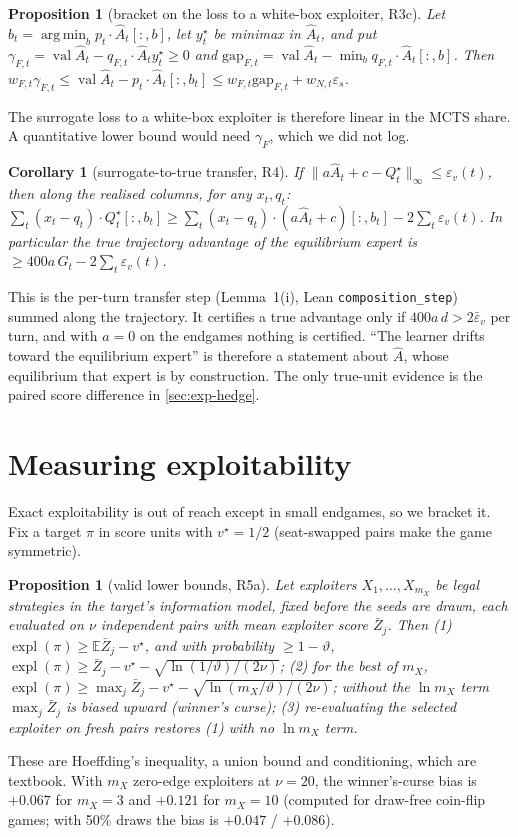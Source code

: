 \documentclass[10pt]{article}
\theoremstyle{plain}
\newtheorem{proposition}[theorem]{Proposition}
\newtheorem{corollary}[theorem]{Corollary}
\theoremstyle{definition}
\theoremstyle{remark}
\newcommand{\E}{\mathbb{E}}
\newcommand{\epss}{\varepsilon_s}
\newcommand{\epsv}{\varepsilon_v}
\newcommand{\Ahat}{\hat A}
\newcommand{\Qstar}{Q^\star}
\DeclareMathOperator{\val}{val}
\DeclareMathOperator{\expl}{expl}
\DeclareMathOperator*{\argmin}{arg\,min}
\begin{document}
\begin{proposition}[bracket on the loss to a white-box exploiter, R3c]\label{prop:R3c}
Let $b_t=\argmin_bp_t\cdot\Ahat_t[:,b]$, let $y^\star_t$ be minimax in $\Ahat_t$, and put $\gamma_{F,t}=\val\Ahat_t-q_{F,t}\cdot\Ahat_ty^\star_t\ge0$ and $\mathrm{gap}_{F,t}=\val\Ahat_t-\min_bq_{F,t}\cdot\Ahat_t[:,b]$. Then $w_{F,t}\gamma_{F,t}\le\val\Ahat_t-p_t\cdot\Ahat_t[:,b_t]\le w_{F,t}\mathrm{gap}_{F,t}+w_{N,t}\epss$.
\end{proposition}
The surrogate loss to a white-box exploiter is therefore linear in the MCTS share. A quantitative lower bound would need $\gamma_F$, which we did not log.

\begin{corollary}[surrogate-to-true transfer, R4]\label{cor:R4}
If $\lVert a\Ahat_t+c-\Qstar_t\rVert_\infty\le\epsv(t)$, then along the realised columns, for any $x_t,q_t$: $\sum_t(x_t-q_t)\cdot\Qstar_t[:,b_t]\ge\sum_t(x_t-q_t)\cdot(a\Ahat_t+c)[:,b_t]-2\sum_t\epsv(t)$. In particular the true trajectory advantage of the equilibrium expert is $\ge400a\,G_t-2\sum_t\epsv(t)$.
\end{corollary}
This is the per-turn transfer step (Lemma~1(i), Lean \texttt{composition\_step}) summed along the trajectory. It certifies a true advantage only if $400a\,d>2\bar\epsv$ per turn, and with $a=0$ on the endgames nothing is certified. ``The learner drifts toward the equilibrium expert'' is therefore a statement about $\Ahat$, whose equilibrium that expert is by construction. The only true-unit evidence is the paired score difference in \cref{sec:exp-hedge}.

\section{Measuring exploitability}
\label{sec:measure}
Exact exploitability is out of reach except in small endgames, so we bracket it. Fix a target $\pi$ in score units with $v^\star=1/2$ (seat-swapped pairs make the game symmetric).

\begin{proposition}[valid lower bounds, R5a]\label{prop:R5a}
Let exploiters $X_1,\dots,X_{m_X}$ be legal strategies in the target's information model, fixed before the seeds are drawn, each evaluated on $\nu$ independent pairs with mean exploiter score $\bar Z_j$. Then (1) $\expl(\pi)\ge\E\bar Z_j-v^\star$, and with probability $\ge1-\vartheta$, $\expl(\pi)\ge\bar Z_j-v^\star-\sqrt{\ln(1/\vartheta)/(2\nu)}$; (2) for the best of $m_X$, $\expl(\pi)\ge\max_j\bar Z_j-v^\star-\sqrt{\ln(m_X/\vartheta)/(2\nu)}$; without the $\ln m_X$ term $\max_j\bar Z_j$ is biased upward (winner's curse); (3) re-evaluating the selected exploiter on fresh pairs restores (1) with no $\ln m_X$ term.
\end{proposition}
These are Hoeffding's inequality, a union bound and conditioning, which are textbook. With $m_X$ zero-edge exploiters at $\nu=20$, the winner's-curse bias is $+0.067$ for $m_X=3$ and $+0.121$ for $m_X=10$ (computed for draw-free coin-flip games; with 50\% draws the bias is $+0.047$ / $+0.086$).
\end{document}

